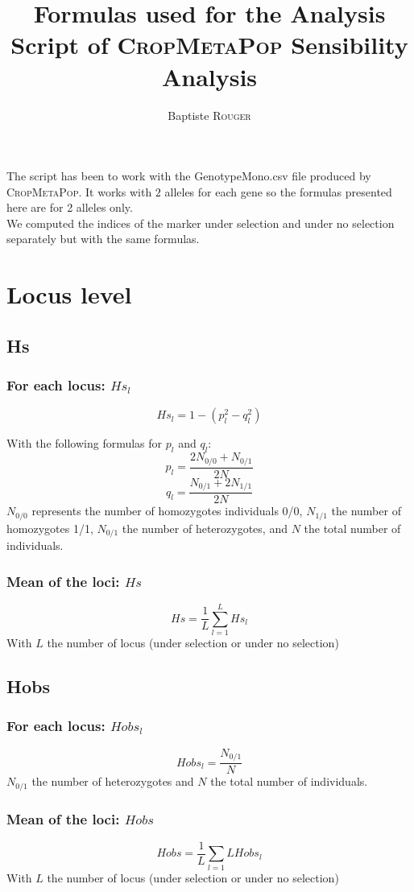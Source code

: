 \documentclass[10pt,a4paper]{article}
\title{Formulas used for the Analysis Script of \textsc{CropMetaPop} Sensibility Analysis}
\author{Baptiste \textsc{Rouger}}
\begin{document}
\maketitle

The script has been to work with the GenotypeMono.csv file produced by \textsc{CropMetaPop}. It works with $2$ alleles for each gene so the formulas presented here are for 2 alleles only.\\
We computed the indices of the marker under selection and under no selection separately but with the same formulas.

\section{Locus level}
\subsection{Hs}
\subsubsection{For each locus: $Hs_l$}
\[ Hs_l = 1 - (p_l^2 - q_l^2) \]

With the following formulas for $p_l$ and $q_l$:
\[ p_l = \frac{2N_{0/0} + N_{0/1}}{2N}\]
\[ q_l = \frac{N_{0/1} + 2N_{1/1}}{2N}\]
$N_{0/0}$ represents the number of homozygotes individuals 0/0, $N_{1/1}$ the number of homozygotes 1/1, $N_{0/1}$ the number of heterozygotes, and $N$ the total number of individuals.
\subsubsection{Mean of the loci: $Hs$}
\[ Hs = \frac{1}{L}\sum_{l=1}^{L} Hs_l \]
With $L$ the number of locus (under selection or under no selection)

\subsection{Hobs}
\subsubsection{For each locus: $Hobs_l$}
\[ Hobs_l = \frac{ N_{0/1} }{N} \]
$N_{0/1}$ the number of heterozygotes and $N$ the total number of individuals.
\subsubsection{Mean of the loci: $Hobs$}
\[ Hobs = \frac{1}{L}\sum_{l=1}{L} Hobs_l\]
With $L$ the number of locus (under selection or under no selection)
\end{document}

